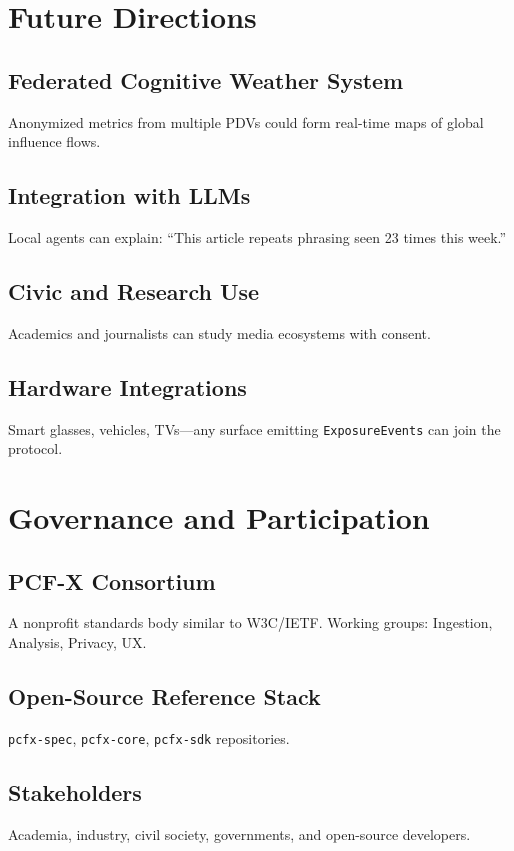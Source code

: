 \documentclass[12pt]{article}
\begin{document}
\section{Future Directions}
\subsection{Federated Cognitive Weather System}
Anonymized metrics from multiple PDVs could form real-time maps of global influence flows.  

\subsection{Integration with LLMs}
Local agents can explain: “This article repeats phrasing seen 23 times this week.”  

\subsection{Civic and Research Use}
Academics and journalists can study media ecosystems with consent.  

\subsection{Hardware Integrations}
Smart glasses, vehicles, TVs—any surface emitting \texttt{ExposureEvents} can join the protocol.

\section{Governance and Participation}
\subsection{PCF-X Consortium}
A nonprofit standards body similar to W3C/IETF.  
Working groups: Ingestion, Analysis, Privacy, UX.

\subsection{Open-Source Reference Stack}
\texttt{pcfx-spec}, \texttt{pcfx-core}, \texttt{pcfx-sdk} repositories.

\subsection{Stakeholders}
Academia, industry, civil society, governments, and open-source developers.
\end{document}
